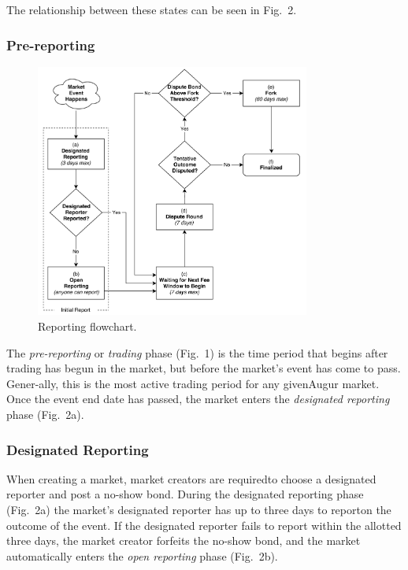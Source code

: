 \documentclass[12pt,floatfix,reprint,nofootinbib,amsmath,amssymb,epsfig,pre,floats,letterpaper,groupedaffiliation]{revtex4-1}
\theoremstyle{definition}
\theoremstyle{definition}
\begin{document}
The relationship between these states can be seen in Fig.~2.

\subsubsection{Pre-reporting}

\begin{figure}
    \includegraphics[width=0.805\textwidth]{2.pdf}
    \caption{Reporting flowchart.}
    \label{fig:reporting}
\end{figure}

The \textit{pre-reporting} or \textit{trading} phase (Fig.~1) is the time period that begins after trading has begun in the market, but before the market's event has come to pass. Gener-\linebreak ally, this is the most active trading period for any given\linebreak Augur market. Once the event end date has passed, the market enters the \textit{designated reporting} phase (Fig.~2a).

\subsubsection{Designated Reporting}

When creating a market, market creators are required\linebreak to choose a designated reporter and post a no-show bond. During the designated reporting phase (Fig.~2a) the market's designated reporter has up to three days to report\linebreak on the outcome of the event. If the designated reporter fails to report within the allotted three days, the market creator forfeits the no-show bond, and the market automatically enters the \textit{open reporting} phase (Fig.~2b).
\end{document}
